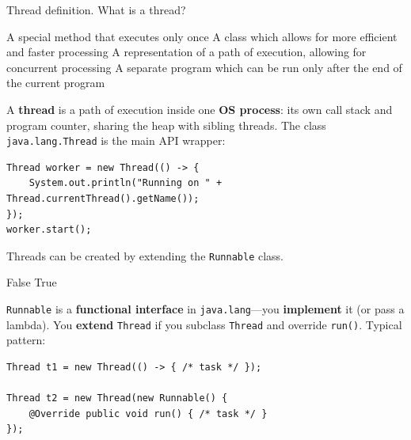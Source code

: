\newpage


\question[4]
Thread definition. What is a thread?
\begin{choices}
  \choice A special method that executes only once
  \choice A class which allows for more efficient and faster processing
  \CorrectChoice A representation of a path of execution, allowing for concurrent processing
  \choice A separate program which can be run only after the end of the current program
\end{choices}
\begin{solution}
  A \textbf{thread} is a path of execution inside one \textbf{OS process}: its own call stack and program counter, sharing the heap with sibling threads. The class \texttt{java.lang.Thread} is the main API wrapper:

\begin{lstlisting}[style=javaexam]
Thread worker = new Thread(() -> {
    System.out.println("Running on " + Thread.currentThread().getName());
});
worker.start();
\end{lstlisting}
\end{solution}

\question[4]
Threads can be created by extending the \texttt{Runnable} class.
\begin{choices}
  \CorrectChoice False
  \choice True
\end{choices}
\begin{solution}
  \texttt{Runnable} is a \textbf{functional interface} in \texttt{java.lang}---you \textbf{implement} it (or pass a lambda). You \textbf{extend} \texttt{Thread} if you subclass \texttt{Thread} and override \texttt{run()}. Typical pattern:

\begin{lstlisting}[style=javaexam]
Thread t1 = new Thread(() -> { /* task */ });

Thread t2 = new Thread(new Runnable() {
    @Override public void run() { /* task */ }
});
\end{lstlisting}
\end{solution}

